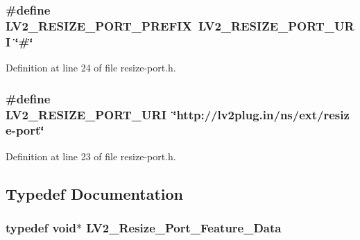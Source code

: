 \subsubsection[{\texorpdfstring{L\+V2\+\_\+\+R\+E\+S\+I\+Z\+E\+\_\+\+P\+O\+R\+T\+\_\+\+P\+R\+E\+F\+IX}{LV2_RESIZE_PORT_PREFIX}}]{\setlength{\rightskip}{0pt plus 5cm}\#define L\+V2\+\_\+\+R\+E\+S\+I\+Z\+E\+\_\+\+P\+O\+R\+T\+\_\+\+P\+R\+E\+F\+IX~{\bf L\+V2\+\_\+\+R\+E\+S\+I\+Z\+E\+\_\+\+P\+O\+R\+T\+\_\+\+U\+RI} \char`\"{}\#\char`\"{}}\hypertarget{resize-port_8h_a9a82350b72ac5f65909c5beaffe8c80e}{}\label{resize-port_8h_a9a82350b72ac5f65909c5beaffe8c80e}


Definition at line 24 of file resize-\/port.\+h.

\subsubsection[{\texorpdfstring{L\+V2\+\_\+\+R\+E\+S\+I\+Z\+E\+\_\+\+P\+O\+R\+T\+\_\+\+U\+RI}{LV2_RESIZE_PORT_URI}}]{\setlength{\rightskip}{0pt plus 5cm}\#define L\+V2\+\_\+\+R\+E\+S\+I\+Z\+E\+\_\+\+P\+O\+R\+T\+\_\+\+U\+RI~\char`\"{}http\+://{\bf lv2plug.\+in}/{\bf ns}/ext/resize-\/port\char`\"{}}\hypertarget{resize-port_8h_a3e1fd289a7fe551916ee4f6050486c0a}{}\label{resize-port_8h_a3e1fd289a7fe551916ee4f6050486c0a}


Definition at line 23 of file resize-\/port.\+h.



\subsection{Typedef Documentation}
\subsubsection[{\texorpdfstring{L\+V2\+\_\+\+Resize\+\_\+\+Port\+\_\+\+Feature\+\_\+\+Data}{LV2_Resize_Port_Feature_Data}}]{\setlength{\rightskip}{0pt plus 5cm}typedef {\bf void}$\ast$ {\bf L\+V2\+\_\+\+Resize\+\_\+\+Port\+\_\+\+Feature\+\_\+\+Data}}\hypertarget{resize-port_8h_abcf71f3dca55343488d9bd36e71d2392}{}\label{resize-port_8h_abcf71f3dca55343488d9bd36e71d2392}


